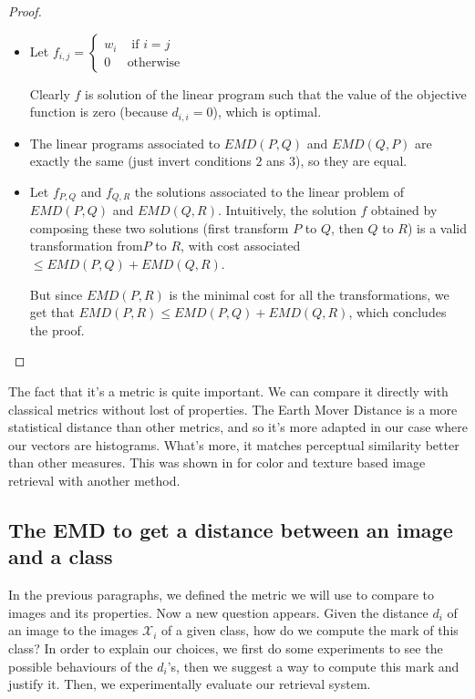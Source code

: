 \begin{proof}

\begin{itemize}
	\item Let $f_{i,j} = \begin{cases}
                        	w_i & \text{ if } i = j\\ 
                       	 	0 & \text{otherwise}
                   	 	 \end{cases}$
	
	Clearly $f$ is solution of the linear program such that the value of the objective function is zero (because $d_{i,i} = 0$), which is optimal.

	\item The linear programs associated to $EMD(P,Q)$ and $EMD(Q,P)$ are exactly the same (just invert conditions $2$ ans $3$), so they are equal.

	\item Let $f_{P,Q}$ and $f_{Q,R}$ the solutions associated to the linear problem of $EMD(P,Q)$ and $EMD(Q,R)$. Intuitively, the solution $f$ obtained by composing these two solutions (first transform $P$ to $Q$, then $Q$ to $R$) is a valid transformation from$P$ to $R$, with cost associated $\leq EMD(P,Q)+EMD(Q,R)$. 

	But since $EMD(P,R)$ is the minimal cost for all the transformations, we get that $EMD(P,R) \leq EMD(P,Q) + EMD(Q,R)$, which concludes the proof.
\end{itemize}

\end{proof}

The fact that it's a metric is quite important. We can compare it directly with classical metrics without lost of properties. The Earth Mover Distance is a more statistical distance than other metrics, and so it's more adapted in our case where our vectors are histograms. What's more, it matches perceptual similarity better than other measures. This was shown in \cite{EMD-use} for color and texture based image retrieval with another method.

\subsection{The EMD to get a distance between an image and a class}

In the previous paragraphs, we defined the metric we will use to compare to images and its properties. Now a new question appears. Given the distance $d_i$ of an image to the images $\mathcal{X}_i$ of a given class, how do we compute the mark of this class? In order to explain our choices, we first do some experiments to see the possible behaviours of the $d_i$'s, then we suggest a way to compute this mark and justify it. Then, we experimentally evaluate our retrieval system.

